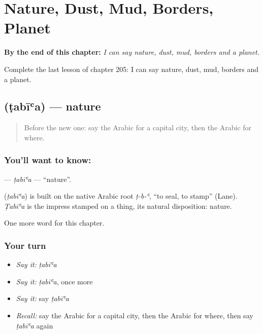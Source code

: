 
\chapter{Nature, Dust, Mud, Borders, Planet}
\label{ch:ar-nature-dust-mud-borders-planet}

\begin{chapteropening}
\textbf{By the end of this chapter:} \emph{I can say nature, dust, mud, borders and a planet.}

Complete the last lesson of chapter 205: I can say nature, dust, mud, borders and a planet.
\end{chapteropening}

\section[\texorpdfstring{\ar{طبيعة} (ṭabīʿa)}{طبيعة (ṭabīʿa)}]{ (ṭabīʿa) — nature}

\label{lesson:AR-C205-tabia}



\begin{quote}
Before the new one: say the Arabic for a capital city, then the Arabic for where.
\end{quote}

\subsection*{You'll want to know: }
\textbf{} — \emph{ṭabīʿa} — \textquotedblleft{}nature\textquotedblright{}.

\begin{cousinweb}
\textbf{} (\emph{ṭabīʿa}) is built on the native Arabic root \emph{ṭ-b-ʿ}, \textquotedblleft{}to seal, to stamp\textquotedblright{} (Lane). \emph{Ṭabīʿa} is the impress stamped on a thing, its natural disposition: nature.
\end{cousinweb}

\begin{grammarlens}[title={What you've built}]
One more word for this chapter.
\end{grammarlens}

\subsection*{Your turn}
\begin{itemize}
\raggedright
  \item \emph{Say it:} \emph{ṭabīʿa}
  \item \emph{Say it:} \emph{ṭabīʿa}, once more
  \item \emph{Say it:} say \emph{ṭabīʿa}
  \item \emph{Recall:} say the Arabic for a capital city, then the Arabic for where, then say \emph{ṭabīʿa} again
\end{itemize}

